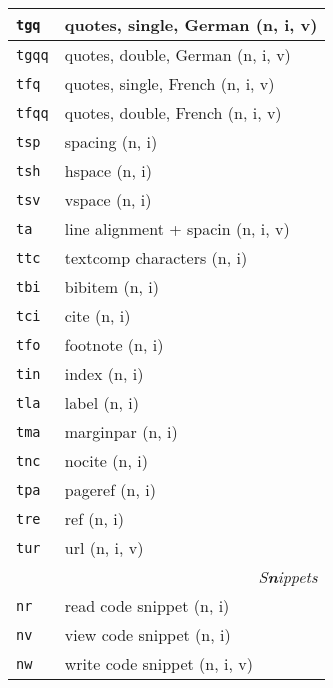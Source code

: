 \documentclass[oneside,10pt,landscape,DIV17]{scrartcl}
\newcommand{\Map}[1] {\textbf{\textasciiacute}\texttt{#1}}
\begin{document}
\begin{multicols}{3}
\begin{center}
\begin{tabular}[]{|p{11mm}|p{60mm}|}
\hline \Map{tgq}  & quotes, single, German         \hfill (n, i, v)\\
\hline \Map{tgqq} & quotes, double, German         \hfill (n, i, v)\\
\hline \Map{tfq}  & quotes, single, French         \hfill (n, i, v)\\
\hline \Map{tfqq} & quotes, double, French         \hfill (n, i, v)\\
\hline \Map{tsp}  & spacing                        \hfill (n, i)\\
\hline \Map{tsh}  & hspace                         \hfill (n, i)\\
\hline \Map{tsv}  & vspace                         \hfill (n, i)\\
\hline \Map{ta}   & line alignment + spacin        \hfill (n, i, v)\\
\hline \Map{ttc}  & textcomp characters            \hfill (n, i)\\
\hline \Map{tbi}  & bibitem                        \hfill (n, i)\\
\hline \Map{tci}  & cite                           \hfill (n, i)\\
\hline \Map{tfo}  & footnote                       \hfill (n, i)\\
\hline \Map{tin}  & index                          \hfill (n, i)\\
\hline \Map{tla}  & label                          \hfill (n, i)\\
\hline \Map{tma}  & marginpar                      \hfill (n, i)\\
\hline \Map{tnc}  & nocite                         \hfill (n, i)\\
\hline \Map{tpa}  & pageref                        \hfill (n, i)\\
\hline \Map{tre}  & ref                            \hfill (n, i)\\
\hline \Map{tur}  & url                            \hfill (n, i, v)\\
\hline
\hline
\multicolumn{2}{|r|}{\textsl{S\textbf{n}ippets}}                \\[1.0ex]
\hline \Map{nr}  & read code snippet         \hfill (n, i)   \\
\hline \Map{nv}  & view code snippet         \hfill (n, i)   \\
\hline \Map{nw}  & write code snippet        \hfill (n, i, v)\\

\end{tabular}
\end{center}
\end{multicols}
\end{document}
